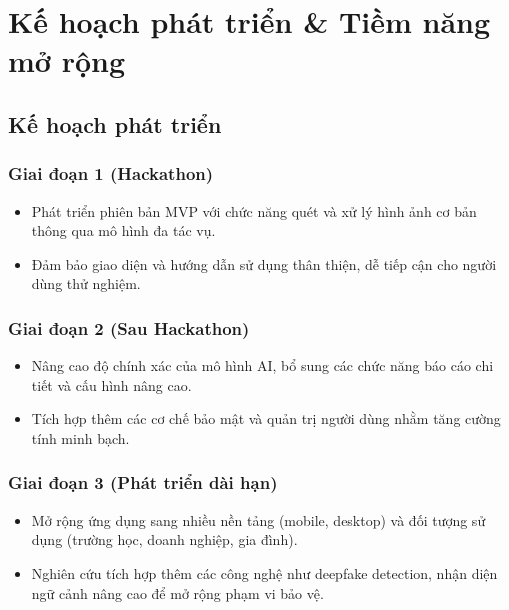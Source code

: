 \documentclass[12pt,a4paper]{article}
\begin{document}
\section{Kế hoạch phát triển \& Tiềm năng mở rộng}

\subsection{Kế hoạch phát triển}

\subsubsection{Giai đoạn 1 (Hackathon)}

\begin{itemize}
  \item Phát triển phiên bản MVP với chức năng quét và xử lý hình ảnh cơ bản thông qua mô hình đa tác vụ.
  
  \item Đảm bảo giao diện và hướng dẫn sử dụng thân thiện, dễ tiếp cận cho người dùng thử nghiệm.
\end{itemize}

\subsubsection{Giai đoạn 2 (Sau Hackathon)}

\begin{itemize}
  \item Nâng cao độ chính xác của mô hình AI, bổ sung các chức năng báo cáo chi tiết và cấu hình nâng cao.
  
  \item Tích hợp thêm các cơ chế bảo mật và quản trị người dùng nhằm tăng cường tính minh bạch.
\end{itemize}

\subsubsection{Giai đoạn 3 (Phát triển dài hạn)}

\begin{itemize}
  \item Mở rộng ứng dụng sang nhiều nền tảng (mobile, desktop) và đối tượng sử dụng (trường học, doanh nghiệp, gia đình).
  
  \item Nghiên cứu tích hợp thêm các công nghệ như deepfake detection, nhận diện ngữ cảnh nâng cao để mở rộng phạm vi bảo vệ.
\end{itemize}
\end{document}
